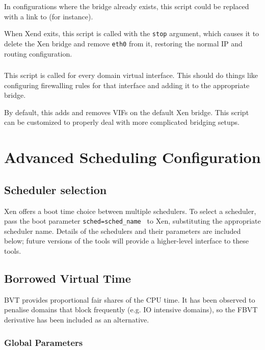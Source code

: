 \documentclass[11pt,twoside,final,openright]{xenstyle}
\begin{document}
{In configurations where the bridge already exists, this script could
be replaced with a link to  (for instance).

When Xend exits, this script is called with the {\tt stop} argument,
which causes it to delete the Xen bridge and remove {\tt eth0} from
it, restoring the normal IP and routing configuration.

\subsection{}

This script is called for every domain virtual interface.  This should
do things like configuring firewalling rules for that interface and
adding it to the appropriate bridge.

By default, this adds and removes VIFs on the default Xen bridge.
This script can be customized to properly deal with more complicated
bridging setups.

\chapter{Advanced Scheduling Configuration}

\section{Scheduler selection}

Xen offers a boot time choice between multiple schedulers.  To select
a scheduler, pass the boot parameter { \tt sched=sched\_name } to Xen,
substituting the appropriate scheduler name.  Details of the schedulers
and their parameters are included below; future versions of the tools
will provide a higher-level interface to these tools.

\section{Borrowed Virtual Time}

BVT provides proportional fair shares of the CPU time.  It has been
observed to penalise domains that block frequently (e.g. IO intensive
domains), so the FBVT derivative has been included as an alternative.

\subsection{Global Parameters}

}
\end{document}
